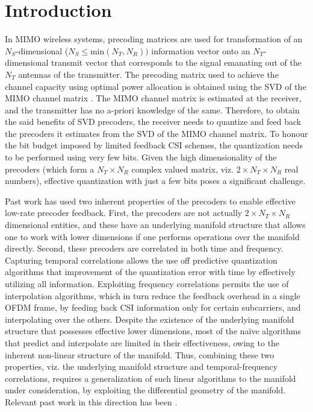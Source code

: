 \documentclass[conference]{IEEEtran}
\begin{document}
\section{Introduction}
\label{intro}
In MIMO wireless systems, precoding matrices are used for transformation of an $N_S$-dimensional ($N_S \leq \text{min}(N_T,N_R))$ information vector onto an $N_T$-dimensional transmit vector that corresponds to the signal emanating out of the $N_T$ antennas of the transmitter.
The precoding matrix used to achieve the channel capacity using optimal power allocation is obtained using the SVD of the MIMO channel matrix \cite{love2008overview}.
The MIMO channel matrix is estimated at the receiver, and the transmitter has no a-priori knowledge of the same.
Therefore, to obtain the said benefits of SVD precoders, the receiver needs to quantize and feed back the precoders it estimates from the SVD of the MIMO channel matrix.
To honour the bit budget imposed by limited feedback CSI schemes, the quantization needs to be performed using very few bits.
Given the high dimensionality of the precoders (which form a $N_T \times N_R$ complex valued matrix, viz. $2\times N_T\times N_R$ real numbers), effective quantization with just a few bits poses a significant challenge.

Past work has used two inherent properties of the precoders to enable effective low-rate precoder feedback.
First, the precoders are not actually $2\times N_T\times N_R$ dimensional entities, and these have an underlying manifold structure that allows one to work with lower dimensions if one performs operations over the manifold directly.
Second, these precoders are correlated in both time and frequency.
Capturing temporal correlations allows the use off predictive quantization algorithms that improvement of the quantization error with time by effectively utilizing all information.
Exploiting frequency correlations permits the use of interpolation algorithms, which in turn reduce the feedback overhead in a single OFDM frame, by feeding back CSI information only for certain subcarriers, and interpolating over the others.
Despite the existence of the underlying manifold structure that possesses effective lower dimensions, most of the na{\"i}ve algorithms that predict and interpolate are limited in their effectiveness, owing to the inherent non-linear structure of the manifold.
Thus, combining these two properties, viz. the underlying manifold structure and temporal-frequency correlations, requires a generalization of such linear algorithms to the manifold under consideration, by exploiting the differential geometry of the manifold. Relevant past work in this direction has been \cite{Gupt1905:Predictive,6891198,6545375,5671092,Li2016,khaled2005quantized,krishnamachari2013geometry}.
\end{document}
